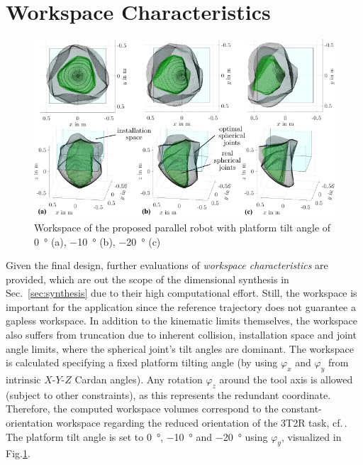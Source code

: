 \documentclass[runningheads,hidelinks]{llncs}
\begin{document}
\section{Workspace Characteristics}\label{sec:performance}
\begin{figure}[tb] 
	\centering
	\vspace{-5mm}
	\includegraphics[width=1.0\linewidth]{workspaces.pdf}
	\caption{Workspace of the proposed parallel robot with platform tilt angle of \SI{0}{\degree} (a), \SI{-10}{\degree} (b), \SI{-20}{\degree} (c)}
	\label{fig:workspace}
	\vspace{-5mm}
\end{figure}
Given the final design, further evaluations of \emph{workspace characteristics} are provided, which are out the scope of the dimensional synthesis in Sec.~\ref{sec:synthesis} due to their high computational effort. 
Still, the workspace is important for the application since the reference trajectory does not guarantee a gapless workspace. %
In addition to the kinematic limits themselves, the workspace also suffers from truncation due to inherent collision, installation space and joint angle limits, where the spherical joint's tilt angles are dominant. 
The workspace is calculated specifying a fixed platform tilting angle (by using $\varphi_x$ and $\varphi_y$ from  intrinsic $X$-$Y$-$Z$ Cardan angles). 
Any rotation $\varphi_z$ around the tool axis is allowed (subject to other constraints), as this represents the redundant coordinate. 
Therefore, the computed workspace volumes correspond to the constant-orientation workspace regarding the reduced orientation of the 3T2R task, cf.\,\cite{Merlet2006}.
The platform tilt angle is set to \SI{0}{\degree}, \SI{-10}{\degree} and \SI{-20}{\degree} using $\varphi_y$, visualized in Fig.\ref{fig:workspace}. 
\end{document}
